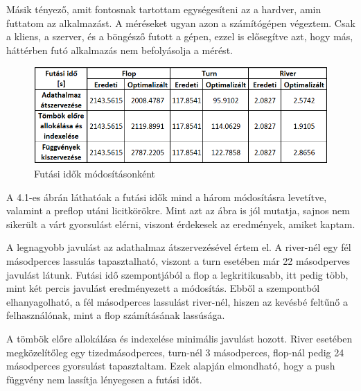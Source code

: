 Másik tényező, amit fontosnak tartottam egységesíteni az a hardver, amin futtatom az alkalmazást. A méréseket ugyan azon a számítógépen végeztem. Csak a kliens, a szerver, és a böngésző futott a gépen, ezzel is elősegítve azt, hogy más, háttérben futó alkalmazás nem befolyásolja a mérést. 

\begin{figure}[h]
\centering
\includegraphics[scale=0.9]{images/running-time.png}
\caption{Futási idők módosításonként}
\label{fig:running-time}
\end{figure}

A 4.1-es ábrán láthatóak a futási idők mind a három módosításra levetítve, valamint a preflop utáni licitkörökre. Mint azt az ábra is jól mutatja, sajnos nem sikerült a várt gyorsulást elérni, viszont érdekesek az eredmények, amiket kaptam.

A legnagyobb javulást az adathalmaz átszervezésével értem el. A river-nél egy fél másodperces lassulás tapasztalható, viszont a turn esetében már 22 másodperves javulást látunk. Futási idő szempontjából a flop a legkritikusabb, itt pedig több, mint két percis javulást eredményezett a módosítás. Ebből a szempontból elhanyagolható, a fél másodperces lassulást river-nél, hiszen az kevésbé feltűnő a felhasználónak, mint a flop számításának lassúsága.

A tömbök előre allokálása és indexelése minimális javulást hozott. River esetében megközelítőleg egy tizedmásodperces, turn-nél 3 másodperces, flop-nál pedig 24 másodperces gyorsulást tapasztaltam. Ezek alapján elmondható, hogy a push függvény nem lassítja lényegesen a futási időt.

